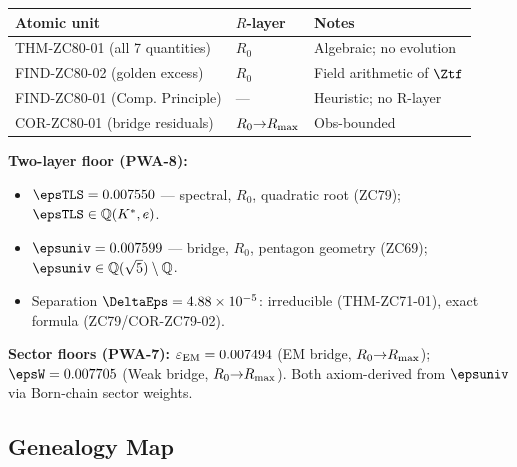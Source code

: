 \documentclass[12pt, a4paper]{article}
\renewcommand{\epsEM}{\varepsilon_{\rm EM}}
\begin{document}
\begin{layerbox}[title={R-Layer Assignments for ZC80}]

{\small\renewcommand{\arraystretch}{1.25}
\begin{center}
\begin{tabular}{@{}p{3.8cm}p{1.5cm}p{6.5cm}@{}}
\toprule
Atomic unit & $R$-layer & Notes \\
\midrule
THM-ZC80-01 (all 7 quantities) & $R_0$ & Algebraic; no evolution \\
FIND-ZC80-02 (golden excess)   & $R_0$ & Field arithmetic of $\Ztf$ \\
FIND-ZC80-01 (Comp. Principle) & ---   & Heuristic; no R-layer \\
COR-ZC80-01 (bridge residuals) & $R_0{\to}R_{\rm max}$ & Obs-bounded \\
\bottomrule
\end{tabular}
\end{center}}

\textbf{Two-layer floor (PWA-8):}
\begin{itemize}[leftmargin=2em, noitemsep]
  \item $\epsTLS = 0.007550$ --- spectral, $R_0$, quadratic root
    (ZC79); $\epsTLS \in \mathbb{Q}(K^*,e)$.
  \item $\epsuniv = 0.007599$ --- bridge, $R_0$, pentagon geometry
    (ZC69); $\epsuniv \in \mathbb{Q}(\sqrt{5})\setminus\mathbb{Q}$.
  \item Separation $\DeltaEps = 4.88\times10^{-5}$: irreducible
    (THM-ZC71-01), exact formula (ZC79/COR-ZC79-02).
\end{itemize}

\textbf{Sector floors (PWA-7):}
$\epsEM = 0.007494$ (EM bridge, $R_0{\to}R_{\rm max}$);
$\epsW = 0.007705$ (Weak bridge, $R_0{\to}R_{\rm max}$).
Both axiom-derived from $\epsuniv$ via Born-chain sector weights.
\end{layerbox}

\subsection{Genealogy Map}
\label{sec:genealogy}
\end{document}

